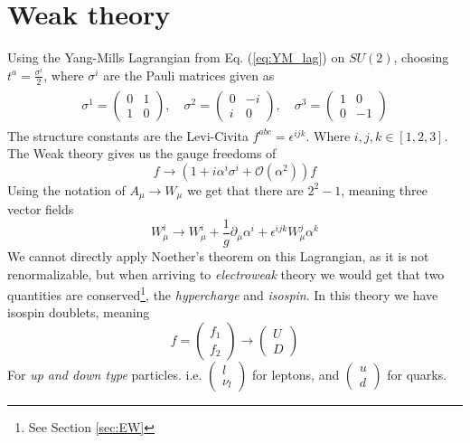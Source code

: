 \documentclass[12pt, a4paper]{book}
\begin{document}
\section{Weak theory}
Using the Yang-Mills Lagrangian from Eq. (\ref{eq:YM_lag}) on $SU(2)$, choosing $t^a =\frac{\sigma^i}{2}$, where $\sigma^i$ are the Pauli matrices given as 
\begin{align}\label{eq:Pauli}
    \begin{split}
        \sigma ^{1}={\begin{pmatrix}0&1\\1&0\end{pmatrix}},\quad 
        \sigma ^{2}={\begin{pmatrix}0&-i\\i&0\end{pmatrix}},\quad 
        \sigma ^{3}={\begin{pmatrix}1&0\\0&-1\end{pmatrix}}
    \end{split}
\end{align} 
The structure constants are the Levi-Civita $f^{abc}=\epsilon^{ijk}$. Where $i,j,k\in[1,2,3]$.
The Weak theory gives us the gauge freedoms of
$$
f \rightarrow \left(1+i \alpha^i \sigma^i + \mathcal{O}(\alpha^2)\right) f
$$ 
Using the notation of $A_\mu\rightarrow W_\mu$ we get that there are $2^2-1$, meaning three vector fields 
$$
W_\mu^i \rightarrow W^i_\mu +\frac{1}{g}\partial_\mu\alpha^i +\epsilon^{ijk}W_\mu^j\alpha^k
$$
We cannot directly apply Noether's theorem on this Lagrangian, as it is not renormalizable, but when arriving to \textit{electroweak} theory we would get that two quantities are conserved\footnote{See Section \ref{sec:EW}}, the \textit{hypercharge} and \textit{isospin}. 
In this theory we have isospin doublets, meaning 
$$
f=\begin{pmatrix}
    f_1\\f_2
\end{pmatrix}
\rightarrow \begin{pmatrix}
    U\\D
\end{pmatrix}
$$
For \textit{up and down type} particles. i.e. $\begin{pmatrix}
    l\\\nu_l
\end{pmatrix}$ for leptons, and $\begin{pmatrix}
    u\\d
\end{pmatrix}$ for quarks.
\end{document}
